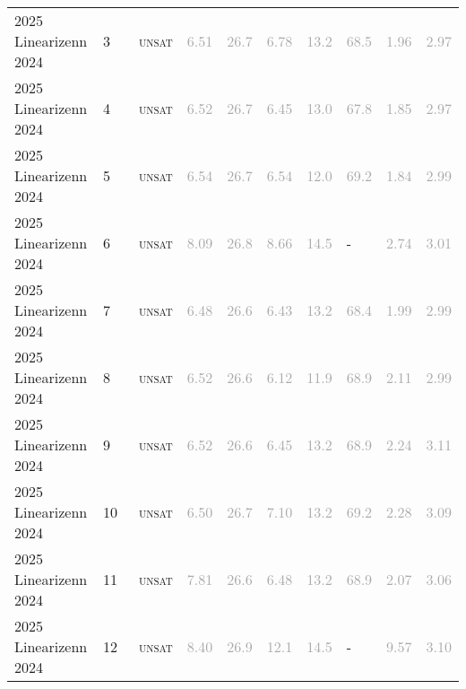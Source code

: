 \begin{center}
{\begin{longtable}{@{}llllllllll@{}}
2025 Linearizenn 2024 & 3 & ~\textsc{unsat} & \textcolor{darkgray}{6.51} & \textcolor{darkgray}{26.7} & \textcolor{darkgray}{6.78} & \textcolor{darkgray}{13.2} & \textcolor{darkgray}{68.5} & \textcolor{darkgray}{1.96} & \textcolor{darkgray}{2.97} \\
2025 Linearizenn 2024 & 4 & ~\textsc{unsat} & \textcolor{darkgray}{6.52} & \textcolor{darkgray}{26.7} & \textcolor{darkgray}{6.45} & \textcolor{darkgray}{13.0} & \textcolor{darkgray}{67.8} & \textcolor{darkgray}{1.85} & \textcolor{darkgray}{2.97} \\
2025 Linearizenn 2024 & 5 & ~\textsc{unsat} & \textcolor{darkgray}{6.54} & \textcolor{darkgray}{26.7} & \textcolor{darkgray}{6.54} & \textcolor{darkgray}{12.0} & \textcolor{darkgray}{69.2} & \textcolor{darkgray}{1.84} & \textcolor{darkgray}{2.99} \\
2025 Linearizenn 2024 & 6 & ~\textsc{unsat} & \textcolor{darkgray}{8.09} & \textcolor{darkgray}{26.8} & \textcolor{darkgray}{8.66} & \textcolor{darkgray}{14.5} & - & \textcolor{darkgray}{2.74} & \textcolor{darkgray}{3.01} \\
2025 Linearizenn 2024 & 7 & ~\textsc{unsat} & \textcolor{darkgray}{6.48} & \textcolor{darkgray}{26.6} & \textcolor{darkgray}{6.43} & \textcolor{darkgray}{13.2} & \textcolor{darkgray}{68.4} & \textcolor{darkgray}{1.99} & \textcolor{darkgray}{2.99} \\
2025 Linearizenn 2024 & 8 & ~\textsc{unsat} & \textcolor{darkgray}{6.52} & \textcolor{darkgray}{26.6} & \textcolor{darkgray}{6.12} & \textcolor{darkgray}{11.9} & \textcolor{darkgray}{68.9} & \textcolor{darkgray}{2.11} & \textcolor{darkgray}{2.99} \\
2025 Linearizenn 2024 & 9 & ~\textsc{unsat} & \textcolor{darkgray}{6.52} & \textcolor{darkgray}{26.6} & \textcolor{darkgray}{6.45} & \textcolor{darkgray}{13.2} & \textcolor{darkgray}{68.9} & \textcolor{darkgray}{2.24} & \textcolor{darkgray}{3.11} \\
2025 Linearizenn 2024 & 10 & ~\textsc{unsat} & \textcolor{darkgray}{6.50} & \textcolor{darkgray}{26.7} & \textcolor{darkgray}{7.10} & \textcolor{darkgray}{13.2} & \textcolor{darkgray}{69.2} & \textcolor{darkgray}{2.28} & \textcolor{darkgray}{3.09} \\
2025 Linearizenn 2024 & 11 & ~\textsc{unsat} & \textcolor{darkgray}{7.81} & \textcolor{darkgray}{26.6} & \textcolor{darkgray}{6.48} & \textcolor{darkgray}{13.2} & \textcolor{darkgray}{68.9} & \textcolor{darkgray}{2.07} & \textcolor{darkgray}{3.06} \\
2025 Linearizenn 2024 & 12 & ~\textsc{unsat} & \textcolor{darkgray}{8.40} & \textcolor{darkgray}{26.9} & \textcolor{darkgray}{12.1} & \textcolor{darkgray}{14.5} & - & \textcolor{darkgray}{9.57} & \textcolor{darkgray}{3.10} \\

\end{longtable}}
\end{center}
